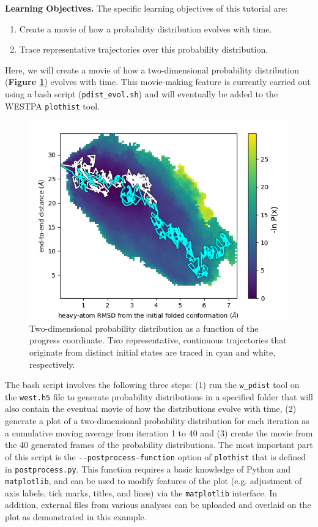 \textbf{Learning Objectives.} The specific learning objectives of this tutorial are:
\begin{enumerate}
\item Create a movie of how a probability distribution evolves with time.
\item Trace representative trajectories over this probability distribution.
\end{enumerate}

Here, we will create a movie of how a two-dimensional probability distribution (\textbf{Figure \ref{fig:landscape-traj}}) evolves with time. 
This movie-making feature is currently carried out using a bash script (\verb|pdist_evol.sh|) and will eventually be added to the WESTPA \verb|plothist| tool. 

\begin{figure}[t]
\centering
\includegraphics[width=\linewidth]{figures/Figure13-2.png}
\caption{Two-dimensional probability distribution as a function of the progress coordinate. 
Two representative, continuous trajectories that originate from distinct initial states are traced in cyan and white, respectively.}
\label{fig:landscape-traj}
\end{figure}

The bash script involves the following three steps: (1) run the \verb|w_pdist| tool on the \verb|west.h5| file to generate probability distributions in a specified folder that will also contain the eventual movie of how the distributions evolve with time, (2) generate a plot of a two-dimensional probability distribution for each iteration as a cumulative moving average from iteration 1 to 40 and (3) create the movie from the 40 generated frames of the probability distributions. 
The most important part of this script is the \verb|--postprocess-function| option of \verb|plothist| that is defined in \verb|postprocess.py|. 
This function requires a basic knowledge of Python and \verb|matplotlib|, and can be used to modify features of the plot (e.g. adjustment of axis labels, tick marks, titles, and lines) via the \verb|matplotlib| interface. 
In addition, external files from various analyses can be uploaded and overlaid on the plot as demonstrated in this example. 

